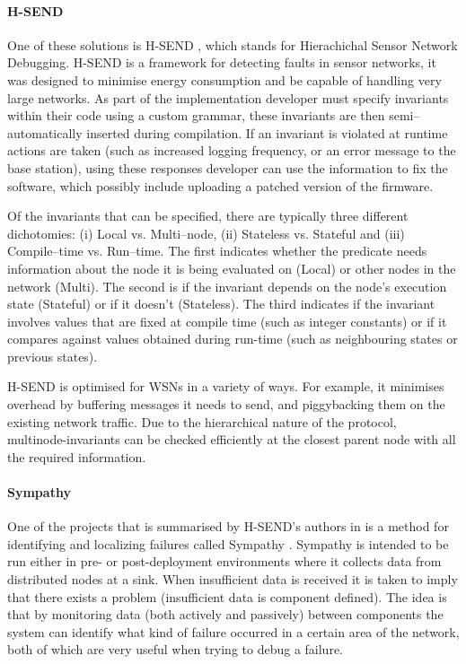 \paragraph{H-SEND} One of these solutions is H-SEND \cite{herbert2007adaptive}, which stands for Hierachichal Sensor Network Debugging. H-SEND is a framework for detecting faults in sensor networks, it was designed to minimise energy consumption and be capable of handling very large networks. As part of the implementation developer must specify invariants within their code using a custom grammar, these invariants are then semi--automatically inserted during compilation. If an invariant is violated at runtime actions are taken (such as increased logging frequency, or an error message to the base station), using these responses developer can use the information to fix the software, which possibly include uploading a patched version of the firmware.

Of the invariants that can be specified, there are typically three different dichotomies: (i) Local vs. Multi--node, (ii) Stateless vs. Stateful and (iii) Compile--time vs. Run--time. The first indicates whether the predicate needs information about the node it is being evaluated on (Local) or other nodes in the network (Multi). The second is if the invariant depends on the node's execution state (Stateful) or if it doesn't (Stateless). The third indicates if the invariant involves values that are fixed at compile time (such as integer constants) or if it compares against values obtained during run-time (such as neighbouring states or previous states).

H-SEND is optimised for WSNs in a variety of ways. For example, it minimises overhead by buffering messages it needs to send, and piggybacking them on the existing network traffic. Due to the hierarchical nature of the protocol, multinode-invariants can be checked efficiently at the closest parent node with all the required information.

\paragraph{Sympathy} One of the projects that is summarised by H-SEND's authors \citeauthor{herbert2007adaptive} in \cite{herbert2007adaptive} is a method for identifying and localizing failures called Sympathy \cite{ramanathan2005sympathy}. Sympathy is intended to be run either in pre- or post-deployment environments where it collects data from distributed nodes at a sink. When insufficient data is received it is taken to imply that there exists a problem (insufficient data is component defined). The idea is that by monitoring data (both actively and passively) between components the system can identify what kind of failure occurred in a certain area of the network, both of which are very useful when trying to debug a failure.

